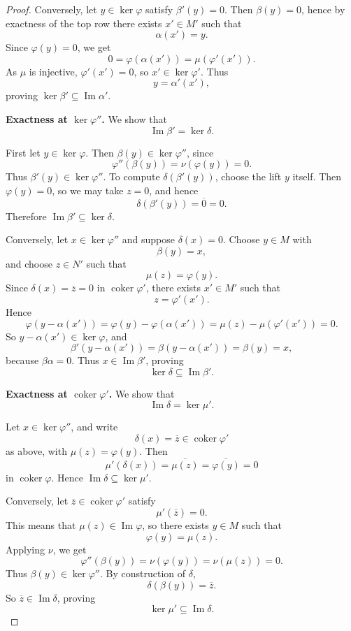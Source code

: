 \begin{proof}
    Conversely, let $y\in \ker\varphi$ satisfy $\beta'(y)=0$. Then $\beta(y)=0$, hence by exactness
    of the top row there exists $x'\in M'$ such that
    \[
        \alpha(x')=y.
    \]
    Since $\varphi(y)=0$, we get
    \[
        0=\varphi(\alpha(x'))=\mu(\varphi'(x')).
    \]
    As $\mu$ is injective, $\varphi'(x')=0$, so $x'\in \ker\varphi'$. Thus
    \[
        y=\alpha'(x'),
    \]
    proving $\ker\beta'\subseteq \operatorname{Im}\alpha'$.

    \medskip

    \noindent\textbf{Exactness at $\ker\varphi''$.}
    We show that
    \[
        \operatorname{Im}\beta'=\ker\delta.
    \]

    First let $y\in \ker\varphi$. Then $\beta(y)\in \ker\varphi''$, since
    \[
        \varphi''(\beta(y))=\nu(\varphi(y))=0.
    \]
    Thus $\beta'(y)\in \ker\varphi''$. To compute $\delta(\beta'(y))$, choose the lift $y$ itself.
    Then $\varphi(y)=0$, so we may take $z=0$, and hence
    \[
        \delta(\beta'(y))=\overline{0}=0.
    \]
    Therefore $\operatorname{Im}\beta'\subseteq \ker\delta$.

    Conversely, let $x\in \ker\varphi''$ and suppose $\delta(x)=0$. Choose $y\in M$ with
    \[
        \beta(y)=x,
    \]
    and choose $z\in N'$ such that
    \[
        \mu(z)=\varphi(y).
    \]
    Since $\delta(x)=\overline{z}=0$ in $\operatorname{coker}\varphi'$, there exists $x'\in M'$ such that
    \[
        z=\varphi'(x').
    \]
    Hence
    \[
        \varphi(y-\alpha(x'))
        =
        \varphi(y)-\varphi(\alpha(x'))
        =
        \mu(z)-\mu(\varphi'(x'))
        =
        0.
    \]
    So $y-\alpha(x')\in \ker\varphi$, and
    \[
        \beta'(y-\alpha(x'))=\beta(y-\alpha(x'))=\beta(y)=x,
    \]
    because $\beta\alpha=0$. Thus $x\in \operatorname{Im}\beta'$, proving
    \[
        \ker\delta\subseteq \operatorname{Im}\beta'.
    \]

    \medskip

    \noindent\textbf{Exactness at $\operatorname{coker}\varphi'$.}
    We show that
    \[
        \operatorname{Im}\delta=\ker\mu'.
    \]

    Let $x\in \ker\varphi''$, and write
    \[
        \delta(x)=\overline{z}\in \operatorname{coker}\varphi'
    \]
    as above, with $\mu(z)=\varphi(y)$. Then
    \[
        \mu'(\delta(x))=\overline{\mu(z)}=\overline{\varphi(y)}=0
    \]
    in $\operatorname{coker}\varphi$. Hence $\operatorname{Im}\delta\subseteq \ker\mu'$.

    Conversely, let $\overline{z}\in \operatorname{coker}\varphi'$ satisfy
    \[
        \mu'(\overline{z})=0.
    \]
    This means that $\mu(z)\in \operatorname{Im}\varphi$, so there exists $y\in M$ such that
    \[
        \varphi(y)=\mu(z).
    \]
    Applying $\nu$, we get
    \[
        \varphi''(\beta(y))=\nu(\varphi(y))=\nu(\mu(z))=0.
    \]
    Thus $\beta(y)\in \ker\varphi''$. By construction of $\delta$,
    \[
        \delta(\beta(y))=\overline{z}.
    \]
    So $\overline{z}\in \operatorname{Im}\delta$, proving
    \[
        \ker\mu'\subseteq \operatorname{Im}\delta.
    \]


\end{proof}

